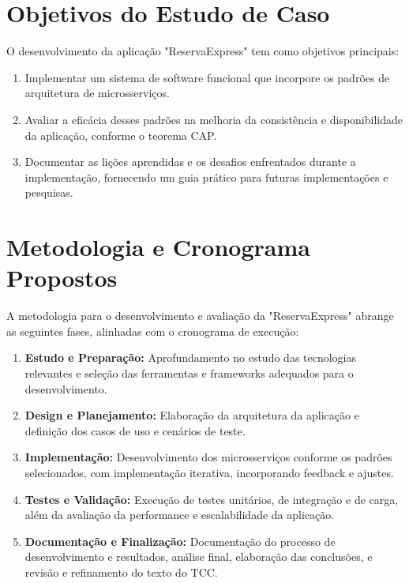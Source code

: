 \section{Objetivos do Estudo de Caso}

O desenvolvimento da aplicação "ReservaExpress" tem como objetivos principais:

\begin{enumerate}
    \item Implementar um sistema de software funcional que incorpore os padrões de arquitetura de microsserviços.
    \item Avaliar a eficácia desses padrões na melhoria da consistência e disponibilidade da aplicação, conforme o teorema CAP.
    \item Documentar as lições aprendidas e os desafios enfrentados durante a implementação, fornecendo um guia prático para futuras implementações e pesquisas.
\end{enumerate}

\section{Metodologia e Cronograma Propostos}

A metodologia para o desenvolvimento e avaliação da "ReservaExpress" abrange as seguintes fases, alinhadas com o cronograma de execução:

\begin{enumerate}
    \item \textbf{Estudo e Preparação:} Aprofundamento no estudo das tecnologias relevantes e seleção das ferramentas e frameworks adequados para o desenvolvimento.
    
    \item \textbf{Design e Planejamento:} Elaboração da arquitetura da aplicação e definição dos casos de uso e cenários de teste.
    
    \item \textbf{Implementação:} Desenvolvimento dos microsserviços conforme os padrões selecionados, com implementação iterativa, incorporando feedback e ajustes.
    
    \item \textbf{Testes e Validação:} Execução de testes unitários, de integração e de carga, além da avaliação da performance e escalabilidade da aplicação.
    
    \item \textbf{Documentação e Finalização:} Documentação do processo de desenvolvimento e resultados, análise final, elaboração das conclusões, e revisão e refinamento do texto do TCC.
\end{enumerate}

